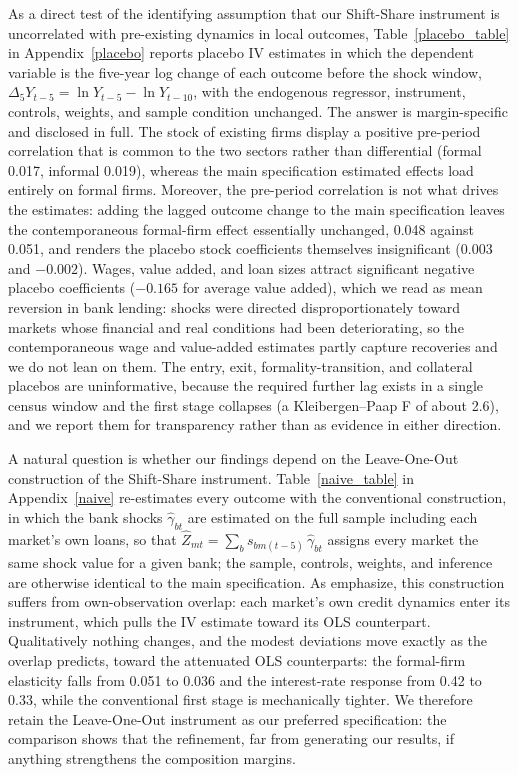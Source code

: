 \documentclass[12pt]{article}
\begin{document}
As a direct test of the identifying assumption that our Shift-Share instrument is uncorrelated with pre-existing dynamics in local outcomes, Table~\ref{placebo_table} in Appendix~\ref{placebo} reports placebo IV estimates in which the dependent variable is the five-year log change of each outcome before the shock window, $\Delta_5 Y_{t-5} = \ln Y_{t-5} - \ln Y_{t-10}$, with the endogenous regressor, instrument, controls, weights, and sample condition unchanged. The answer is margin-specific and disclosed in full. The stock of existing firms display a positive pre-period correlation that is common to the two sectors rather than differential (formal 0.017, informal 0.019), whereas the main specification estimated effects load entirely on formal firms. Moreover, the pre-period correlation is not what drives the estimates: adding the lagged outcome change to the main specification leaves the contemporaneous formal-firm effect essentially unchanged, 0.048 against 0.051, and renders the placebo stock coefficients themselves insignificant (0.003 and $-0.002$). Wages, value added, and loan sizes attract significant negative placebo coefficients ($-0.165$ for average value added), which we read as mean reversion in bank lending: shocks were directed disproportionately toward markets whose financial and real conditions had been deteriorating, so the contemporaneous wage and value-added estimates partly capture recoveries and we do not lean on them. The entry, exit, formality-transition, and collateral placebos are uninformative, because the required further lag exists in a single census window and the first stage collapses (a Kleibergen--Paap F of about 2.6), and we report them for transparency rather than as evidence in either direction.

A natural question is whether our findings depend on the Leave-One-Out construction of the Shift-Share instrument. Table~\ref{naive_table} in Appendix~\ref{naive} re-estimates every outcome with the conventional construction, in which the bank shocks $\hat{\gamma}_{bt}$ are estimated on the full sample including each market's own loans, so that $\hat{Z}_{mt} = \sum_b s_{bm(t-5)}\,\hat{\gamma}_{bt}$ assigns every market the same shock value for a given bank; the sample, controls, weights, and inference are otherwise identical to the main specification. As \citet{borusyak2022quasi} emphasize, this construction suffers from own-observation overlap: each market's own credit dynamics enter its instrument, which pulls the IV estimate toward its OLS counterpart. Qualitatively nothing changes, and the modest deviations move exactly as the overlap predicts, toward the attenuated OLS counterparts: the formal-firm elasticity falls from 0.051 to 0.036 and the interest-rate response from 0.42 to 0.33, while the conventional first stage is mechanically tighter. We therefore retain the Leave-One-Out instrument as our preferred specification: the comparison shows that the refinement, far from generating our results, if anything strengthens the composition margins.
\end{document}
